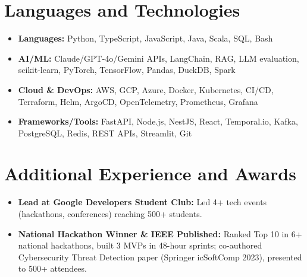 \documentclass[9pt,letterpaper]{extarticle}
\begin{document}
\section{Languages and Technologies}
\begin{itemize}
\item \textbf{Languages:} Python, TypeScript, JavaScript, Java, Scala, SQL, Bash
\item \textbf{AI/ML:} Claude/GPT-4o/Gemini APIs, LangChain, RAG, LLM evaluation, scikit-learn, PyTorch, TensorFlow, Pandas, DuckDB, Spark
\item \textbf{Cloud \& DevOps:} AWS, GCP, Azure, Docker, Kubernetes, CI/CD, Terraform, Helm, ArgoCD, OpenTelemetry, Prometheus, Grafana
\item \textbf{Frameworks/Tools:} FastAPI, Node.js, NestJS, React, Temporal.io, Kafka, PostgreSQL, Redis, REST APIs, Streamlit, Git
\end{itemize}

\section{Additional Experience and Awards}
\begin{itemize}
\item \textbf{Lead at Google Developers Student Club:} Led 4+ tech events (hackathons, conferences) reaching 500+ students.
\item \textbf{National Hackathon Winner \& IEEE Published:} Ranked Top 10 in 6+ national hackathons, built 3 MVPs in 48-hour sprints; co-authored Cybersecurity Threat Detection paper (Springer icSoftComp 2023), presented to 500+ attendees.
\end{itemize}
\end{document}
